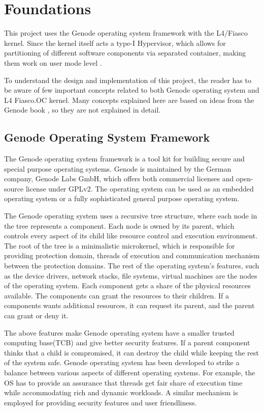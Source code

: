 \chapter{ Foundations} \label{foundations}
This project uses the Genode operating system framework with the L4/Fiasco kernel. Since the kernel itself acts a type-I Hypervisor, which allows for partitioning of different software components via separated container, making them work on user mode level \cite{kia4sm}.

To understand the design and implementation of this project, the reader has to be aware of few important concepts related to both Genode operating system and L4 Fiasco.OC kernel. Many concepts explained here are based on ideas from the Genode book \cite{genodebook}, so they are not explained in detail.

\section{Genode Operating System Framework} \label{foundations_genode}
The Genode operating system framework is a tool kit for building secure and special purpose operating systems. Genode is maintained by the German company, Genode Labs GmbH, which  offers both commercial licenses  and open-source license under GPLv2. The operating system can be used as an embedded operating system or a fully sophisticated general purpose operating system. 

The Genode operating system uses a recursive tree structure, where each node in the tree represents a component. Each node is owned by its parent, which controls every aspect of its child like resource control and execution environment. The root of the tree is a minimalistic microkernel, which is responsible for providing protection domain, threads of execution and communication mechanism between the protection domains. The rest of the operating system's features, such as the device drivers, network stacks, file systems, virtual machines are the nodes of the operating system. Each component gets a share of the physical resources available. The components can grant the resources to their children. If a components wants additional resources, it can request its parent, and the parent can grant or deny it.

The above features make Genode operating system have a smaller trusted computing base(TCB) and give better security features. If a parent component thinks that a child is compromised, it can destroy the child while keeping the rest of the system safe. Genode operating system has been developed to strike a balance between various aspects of different operating systems. For example, the OS has to provide an assurance that threads get fair share of execution time while accommodating rich and dynamic workloads. A similar mechanism is employed for providing security features and user friendliness.

